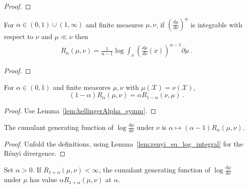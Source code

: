 \begin{proof}\leanok
{}
\end{proof}

\begin{lemma}
  \label{lem:renyi_eq_log_integral'}
  \leanok
  For $\alpha \in (0,1)\cup(1, \infty)$ and finite measures $\mu, \nu$, if 
  $\left(\frac{d \mu}{d \nu}\right)^\alpha$ is integrable with respect to $\nu$ and $\mu \ll \nu$ then
  \begin{align*}
  R_\alpha(\mu, \nu) = \frac{1}{\alpha - 1} \log \int_x \left(\frac{d \mu}{d \nu}(x)\right)^{\alpha - 1} \partial \mu
  \: .
  \end{align*}
\end{lemma}

\begin{proof}\leanok
{}
\end{proof}

\begin{lemma}
  \label{lem:renyi_symm}
  \leanok
  For $\alpha \in (0, 1)$ and finite measures $\mu, \nu$ with $\mu(\mathcal X) = \nu(\mathcal X)$, 
  \[(1 - \alpha) R_\alpha(\mu, \nu) = \alpha R_{1 - \alpha}(\nu, \mu) \: .\]
\end{lemma}

\begin{proof}\leanok
{}
Use Lemma~\ref{lem:hellingerAlpha_symm}.
\end{proof}

\begin{lemma}
  \label{lem:renyi_cgf}
  \leanok
  The cumulant generating function of $\log\frac{d\mu}{d\nu}$ under $\nu$ is $\alpha \mapsto (\alpha - 1) R_\alpha(\mu, \nu)$.
\end{lemma}

\begin{proof}\leanok
{}
Unfold the definitions, using Lemma~\ref{lem:renyi_eq_log_integral} for the Rényi divergence.
\end{proof}

\begin{lemma}
  \label{lem:renyi_cgf_2}
  \leanok
  Set $\alpha > 0$. If $R_{1+\alpha}(\mu, \nu) < \infty$, the cumulant generating function of $\log\frac{d\mu}{d\nu}$ under $\mu$ has value $\alpha R_{1+\alpha}(\mu, \nu)$ at $\alpha$.
\end{lemma}

